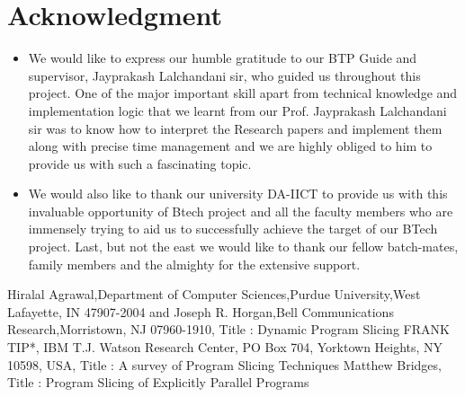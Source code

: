 \documentclass[conference]{IEEEtran}
\begin{document}
\section*{Acknowledgment}
\begin{itemize}
\item We would like to express our humble gratitude to our BTP Guide and supervisor, Jayprakash Lalchandani sir, who guided us throughout this project. One of the major important skill apart from technical knowledge and implementation logic that we learnt from our Prof. Jayprakash Lalchandani sir was to know how to interpret the Research papers and implement them along with precise time management and we are highly obliged to him to provide us with such a fascinating topic.
\item We would also like to thank our university DA-IICT to provide us with this invaluable opportunity of Btech project and all the faculty members who are immensely trying to aid us to successfully achieve the target of our BTech project. Last, but not the east we would like to thank our fellow batch-mates, family members and the almighty for the extensive support.  
\end{itemize}    
\begin{thebibliography}{00}
 Hiralal Agrawal,Department of Computer Sciences,Purdue University,West Lafayette, IN 47907-2004 and Joseph R. Horgan,Bell Communications Research,Morristown, NJ 07960-1910, Title : Dynamic Program Slicing
 FRANK TIP*, IBM T.J. Watson Research Center, PO Box 704, Yorktown Heights, NY 10598, USA, Title : A survey of Program Slicing Techniques
 Matthew Bridges, Title : Program Slicing of Explicitly Parallel Programs
\end{thebibliography}
\vspace{12pt}
\end{document}
